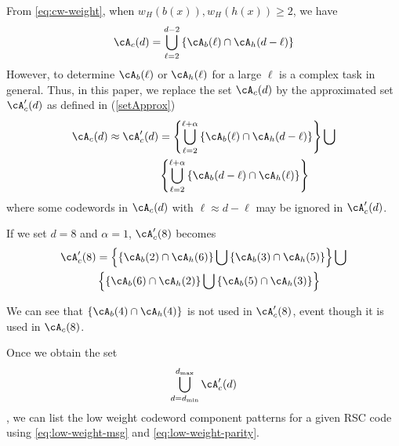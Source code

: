 From \eqref{eq:cw-weight}, when $w_H(b(x)), w_H(h(x)) \geq 2$, we have
\begin{align}
\cA_c(d) = \bigcup_{\ell = 2}^{d-2} \left\{\cA_b(\ell) \cap \cA_h(d-\ell)\right\}
\label{Eq:exactset}
\end{align}
However, to determine $\cA_b(\ell)$ or $\cA_h(\ell)$ for a large $\ell$ is a complex task in general. Thus, in this paper, we replace the set $\cA_c(d)$ by the approximated set $\cA_c'(d)$ as defined in  (\ref{setApprox})
\begin{equation}
\begin{split}
\cA_c(d) \approx \cA_c'(d) &= \left\{\bigcup_{\ell = 2}^{\ell+\alpha} \left\{\cA_b(\ell) \cap \cA_h(d-\ell)\right\}\right\}\bigcup \\
&\left\{\bigcup_{\ell = 2}^{\ell+\alpha} \left\{\cA_b(d-\ell) \cap \cA_h(\ell)\right\}\right\}
\end{split}
\label{setApprox}
\end{equation}
where some codewords in $\cA_c(d)$ with $\ell \approx d-\ell$ may be ignored in $\cA_c'(d)$.
\begin{example}
If we set $d=8$ and  $\alpha=1$, $\cA_c'(8)$ becomes
\begin{equation*}
\begin{split}
\cA_c'(8) &=\left\{\left\{\cA_b(2) \cap \cA_h(6)\right\} \bigcup  \left\{\cA_b(3) \cap \cA_h(5)\right\} \right\} \bigcup \\
& \left\{\left\{\cA_b(6) \cap \cA_h(2)\right\} \bigcup  \left\{\cA_b(5) \cap \cA_h(3)\right\} \right\} \\
\end{split}
\end{equation*}

We can see that $\left\{\cA_b(4) \cap \cA_h(4)\right\}$ is not used in $\cA_c'(8)$, event though it is used in $\cA_c(8)$.
\end{example}
Once we obtain the set
 \begin{equation*}
 \bigcup_{d = d_{\text{min}}}^{d_{\text{max}}} \cA'_c(d) 
\label{Eq:exactsetunion}
\end{equation*}
, we can list the low weight codeword component patterns for a given RSC code using \eqref{eq:low-weight-msg} and \eqref{eq:low-weight-parity}. 




